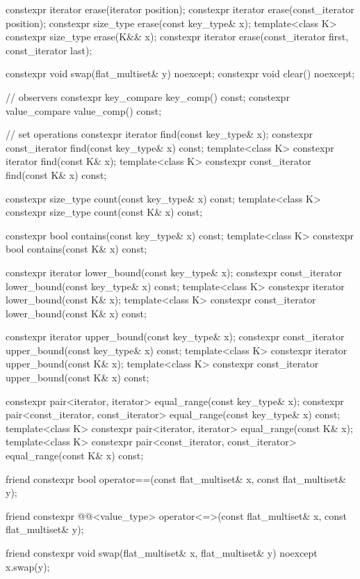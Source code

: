 \begin{codeblock}
{{    constexpr iterator erase(iterator position);
    constexpr iterator erase(const_iterator position);
    constexpr size_type erase(const key_type& x);
    template<class K> constexpr size_type erase(K&& x);
    constexpr iterator erase(const_iterator first, const_iterator last);

    constexpr void swap(flat_multiset& y) noexcept;
    constexpr void clear() noexcept;

    // observers
    constexpr key_compare key_comp() const;
    constexpr value_compare value_comp() const;

    // set operations
    constexpr iterator find(const key_type& x);
    constexpr const_iterator find(const key_type& x) const;
    template<class K> constexpr iterator find(const K& x);
    template<class K> constexpr const_iterator find(const K& x) const;

    constexpr size_type count(const key_type& x) const;
    template<class K> constexpr size_type count(const K& x) const;

    constexpr bool contains(const key_type& x) const;
    template<class K> constexpr bool contains(const K& x) const;

    constexpr iterator lower_bound(const key_type& x);
    constexpr const_iterator lower_bound(const key_type& x) const;
    template<class K> constexpr iterator lower_bound(const K& x);
    template<class K> constexpr const_iterator lower_bound(const K& x) const;

    constexpr iterator upper_bound(const key_type& x);
    constexpr const_iterator upper_bound(const key_type& x) const;
    template<class K> constexpr iterator upper_bound(const K& x);
    template<class K> constexpr const_iterator upper_bound(const K& x) const;

    constexpr pair<iterator, iterator> equal_range(const key_type& x);
    constexpr pair<const_iterator, const_iterator> equal_range(const key_type& x) const;
    template<class K>
      constexpr pair<iterator, iterator> equal_range(const K& x);
    template<class K>
      constexpr pair<const_iterator, const_iterator> equal_range(const K& x) const;

    friend constexpr bool operator==(const flat_multiset& x, const flat_multiset& y);

    friend constexpr @@<value_type>
      operator<=>(const flat_multiset& x, const flat_multiset& y);

    friend constexpr void swap(flat_multiset& x, flat_multiset& y) noexcept
      { x.swap(y); }

}}
\end{codeblock}
